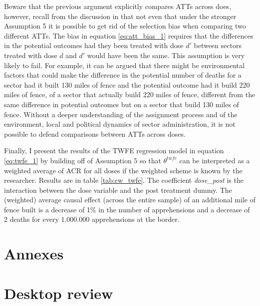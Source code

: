 \documentclass[titlepage]{article}
\theoremstyle{plain}
\theoremstyle{plain}
\begin{document}
Beware that the previous argument explicitly compares ATTs across does, however, recall from the discussion in \cite{callaway2021differenceindifferences} that not even that under the stronger Assumption 5 it is possible to get rid of the selection bias when comparing two different ATTs. The bias in equation \ref{eq:att_bias_1} requires that the differences in the potential outcomes had they been treated with dose $d'$ between sectors treated with dose $d$ and $d'$ would have been the same. This assumption is very likely to fail. For example, it can be argued that there might be environmental factors that could make the difference in the potential number of deaths for a sector had it built 130 miles of fence and the potential outcome had it build 220 miles of fence, of a sector that actually build 220 miles of fence, different from the same difference in potential outcomes but on a sector that build 130 miles of fence. Without a deeper understanding of the assignment process and of the environment, local and political dynamics of sector administration, it is not possible to defend comparisons between ATTs across doses.

Finally, I present the results of the TWFE regression model in equation \ref{eq:twfe_1} by building off of Assumption 5 so that $\theta^{twfe}$ can be interpreted as a weighted average of ACR for all doses if the weighted scheme is known by the researcher. Results are in table \ref{tab:cw_twfe}. The coefficient \textit{dose\_post} is the interaction between the dose variable and the post treatment dummy. The (weighted) average causal effect (across the entire sample) of an additional mile of fence built is a decrease of 1\% in the number of apprehensions and a decrease of 2 deaths for every 1.000.000 apprehensions at the border.



\newpage
\printbibliography[
heading=bibintoc,
title={References}]


\appendix
{}
\section*{Annexes}

\section{Desktop review}
\end{document}
